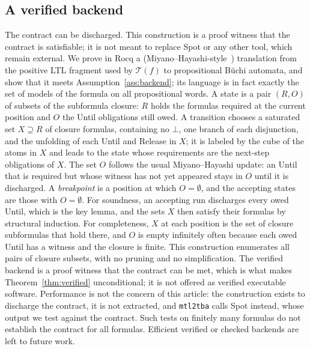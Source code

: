 \documentclass[manuscript]{acmart}
\newcommand{\T}{\mathcal{T}}
\begin{document}
\subsection{A verified backend}
\label{subsec:verified-backend}
The contract can be discharged. This construction is a proof witness that the
contract is satisfiable; it is not meant to replace Spot or any other tool, which
remain external. We prove in Rocq a
(Miyano--Hayashi-style~\cite{miyano_hayashi_tcs84}) translation from the positive LTL fragment used by
$\T(f)$ to propositional B\"uchi automata, and show that it meets
Assumption~\ref{ass:backend}; its language is in fact exactly the set of models
of the formula on all propositional words. A state is a pair $(R,O)$ of subsets
of the subformula closure: $R$ holds the formulas required at the current
position and $O$ the Until obligations still owed. A transition chooses a
saturated set $X\supseteq R$ of closure formulas, containing no $\bot$, one
branch of each disjunction, and the unfolding of each Until and Release in
$X$; it is labeled by the cube of the atoms in $X$ and leads to the state whose
requirements are the next-step obligations of $X$. The set $O$ follows the
usual Miyano--Hayashi update: an Until that is required but whose witness has not
yet appeared stays in $O$ until it is discharged. A \emph{breakpoint} is a
position at which $O=\emptyset$, and the accepting states are those with
$O=\emptyset$.
For soundness, an accepting run discharges every owed Until, which is the key
lemma, and the sets $X$ then satisfy their formulas by structural induction.
For completeness, $X$ at each position is the set of closure subformulas that
hold there, and $O$ is empty infinitely often because each owed Until has a
witness and the closure is finite. This construction enumerates all pairs of
closure subsets, with no pruning and no simplification.
The verified backend is a proof witness that the contract can be met, which is
what makes Theorem~\ref{thm:verified} unconditional; it is not offered as
verified executable software. Performance is not the
concern of this article: the construction exists to discharge the contract, it
is not extracted, and \texttt{mtl2tba} calls Spot instead, whose output we test
against the contract. Such tests on finitely many formulas do not establish the
contract for all formulas. Efficient verified or checked backends are left to
future work.
\end{document}
